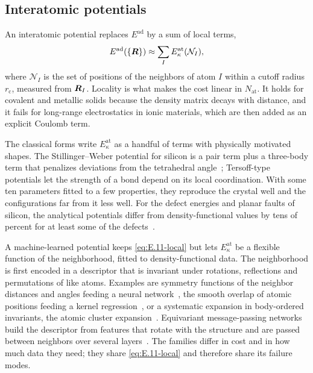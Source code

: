 \subsection{Interatomic potentials}

An interatomic potential replaces $E^{\mathrm{ad}}$ by a sum of local terms,
\begin{equation}
  E^{\mathrm{ad}}(\{\bm{R}\}) \approx \sum_I E^{\mathrm{at}}_\kappa(\mathcal{N}_I),
  \label{eq:E.11-local}
\end{equation}
where $\mathcal{N}_I$ is the set of positions of the neighbors of atom $I$ within a cutoff radius $r_{\mathrm{c}}$, measured from $\bm{R}_I$. Locality is what makes the cost linear in $N_{\mathrm{at}}$. It holds for covalent and metallic solids because the density matrix decays with distance, and it fails for long-range electrostatics in ionic materials, which are then added as an explicit Coulomb term.

The classical forms write $E^{\mathrm{at}}_\kappa$ as a handful of terms with physically motivated shapes. The Stillinger--Weber potential for silicon is a pair term plus a three-body term that penalizes deviations from the tetrahedral angle~\cite{stillinger1985computer}; Tersoff-type potentials let the strength of a bond depend on its local coordination. With some ten parameters fitted to a few properties, they reproduce the crystal well and the configurations far from it less well. For the defect energies and planar faults of silicon, the analytical potentials differ from density-functional values by tens of percent for at least some of the defects~\cite[Sect.~III\,E]{bartok2018machine}.

A machine-learned potential keeps \cref{eq:E.11-local} but lets $E^{\mathrm{at}}_\kappa$ be a flexible function of the neighborhood, fitted to density-functional data. The neighborhood is first encoded in a descriptor that is invariant under rotations, reflections and permutations of like atoms. Examples are symmetry functions of the neighbor distances and angles feeding a neural network~\cite{behler2007generalized}, the smooth overlap of atomic positions feeding a kernel regression~\cite{bartok2010gaussian}, or a systematic expansion in body-ordered invariants, the atomic cluster expansion~\cite{drautz2019atomic}. Equivariant message-passing networks build the descriptor from features that rotate with the structure and are passed between neighbors over several layers~\cite{batzner2022e3,batatia2022mace}. The families differ in cost and in how much data they need; they share \cref{eq:E.11-local} and therefore share its failure modes.

